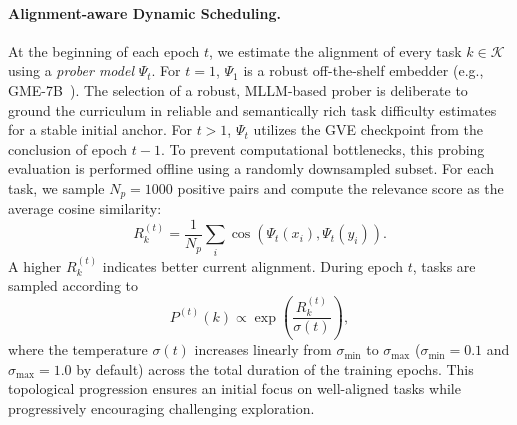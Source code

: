 \paragraph{Alignment-aware Dynamic Scheduling.}
At the beginning of each epoch $t$, we estimate the alignment of every task $k \in \mathcal{K}$ using a \textit{prober model} $\Psi_t$. For $t=1$, $\Psi_1$ is a robust off-the-shelf embedder (e.g., GME-7B~\cite{Zhang_2025_CVPR}). The selection of a robust, MLLM-based prober is deliberate to ground the curriculum in reliable and semantically rich task difficulty estimates for a stable initial anchor. For $t>1$, $\Psi_t$ utilizes the GVE checkpoint from the conclusion of epoch $t-1$. To prevent computational bottlenecks, this probing evaluation is performed offline using a randomly downsampled subset. For each task, we sample $N_p=1000$ positive pairs and compute the relevance score as the average cosine similarity:
\begin{equation*}
R_k^{(t)} = \frac{1}{N_p} \sum_i \cos\!\left(\Psi_t(x_i), \Psi_t(y_i)\right).
\end{equation*}
A higher $R_k^{(t)}$ indicates better current alignment.
During epoch $t$, tasks are sampled according to
\begin{equation*}
P^{(t)}(k) \propto \exp\!\left(\frac{R_k^{(t)}}{\sigma(t)}\right),
\end{equation*}
where the temperature $\sigma(t)$ increases linearly from $\sigma_{\min}$ to $\sigma_{\max}$ ($\sigma_{\min}=0.1$ and $\sigma_{\max}=1.0$ by default) across the total duration of the training epochs. This topological progression ensures an initial focus on well-aligned tasks while progressively encouraging challenging exploration.

